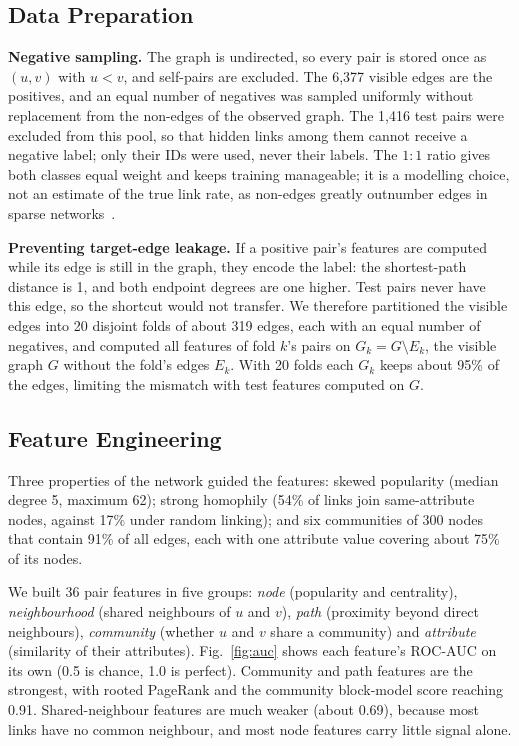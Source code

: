 \documentclass[runningheads]{llncs}
\begin{document}
\subsection{Data Preparation}
\label{Data Preparation}
\noindent\textbf{Negative sampling.} The graph is undirected, so every pair is stored once as $(u,v)$ with $u < v$, and self-pairs are excluded. The 6,377 visible edges are the positives, and an equal number of negatives was sampled uniformly without replacement from the non-edges of the observed graph. The 1,416 test pairs were excluded from this pool, so that hidden links among them cannot receive a negative label; only their IDs were used, never their labels. The $1:1$ ratio gives both classes equal weight and keeps training manageable; it is a modelling choice, not an estimate of the true link rate, as non-edges greatly outnumber edges in sparse networks~\cite{lu_link_2011}.

\noindent\textbf{Preventing target-edge leakage.} If a positive pair's features are computed while its edge is still in the graph, they encode the label: the shortest-path distance is 1, and both endpoint degrees are one higher. Test pairs never have this edge, so the shortcut would not transfer. We therefore partitioned the visible edges into 20 disjoint folds of about 319 edges, each with an equal number of negatives, and computed all features of fold $k$'s pairs on $G_k = G \setminus E_k$, the visible graph $G$ without the fold's edges $E_k$. With 20 folds each $G_k$ keeps about 95\% of the edges, limiting the mismatch with test features computed on $G$.

\subsection{Feature Engineering}
\label{Feature Engineering}

Three properties of the network guided the features: skewed popularity (median degree 5, maximum 62); strong homophily (54\% of links join same-attribute nodes, against 17\% under random linking); and six communities of 300 nodes that contain 91\% of all edges, each with one attribute value covering about 75\% of its nodes.

We built 36 pair features in five groups: \emph{node} (popularity and centrality), \emph{neighbourhood} (shared neighbours of $u$ and $v$), \emph{path} (proximity beyond direct neighbours), \emph{community} (whether $u$ and $v$ share a community) and \emph{attribute} (similarity of their attributes). Fig.~\ref{fig:auc} shows each feature's ROC-AUC on its own (0.5 is chance, 1.0 is perfect). Community and path features are the strongest, with rooted PageRank and the community block-model score reaching 0.91. Shared-neighbour features are much weaker (about 0.69), because most links have no common neighbour, and most node features carry little signal alone.
\end{document}
